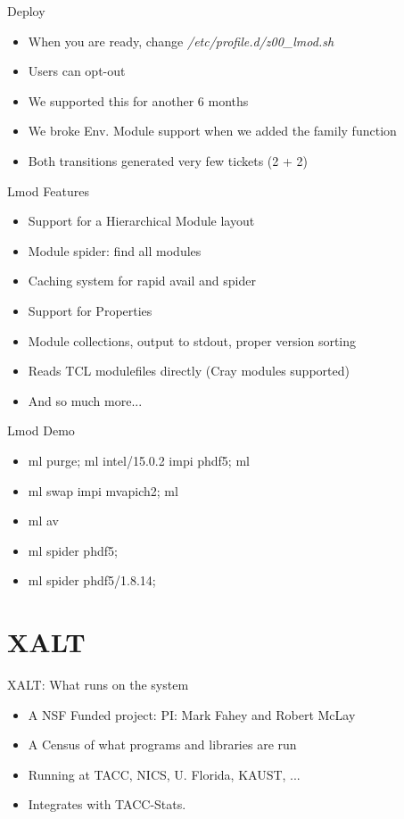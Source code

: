 \documentclass{beamer}
\begin{document}
\begin{frame}{Deploy}
  \begin{itemize}
    \item When you are ready, change \emph{/etc/profile.d/z00\_lmod.sh}
    \item Users can opt-out
    \item We supported this for another 6 months
    \item We broke Env. Module support when we added the family function
    \item Both transitions generated very few tickets (2 + 2)
  \end{itemize}
\end{frame}

\begin{frame}{Lmod Features}
  \begin{itemize}
    \item Support for a Hierarchical Module layout
    \item Module spider: find all modules
    \item Caching system for rapid avail and spider
    \item Support for Properties
    \item Module collections, output to stdout, proper version sorting
    \item Reads TCL modulefiles directly (Cray modules supported)
    \item And so much more...
  \end{itemize}
\end{frame}

\begin{frame}{Lmod Demo}
  \begin{itemize}
    \item ml purge; ml intel/15.0.2 impi phdf5; ml
    \item ml swap impi mvapich2; ml
    \item ml av
    \item ml spider phdf5;
    \item ml spider phdf5/1.8.14;
  \end{itemize}
\end{frame}

\section{XALT}

\begin{frame}{XALT: What runs on the system}
  \begin{itemize}
    \item A NSF Funded project: PI: Mark Fahey and Robert McLay
    \item A Census of what programs and libraries are run
    \item Running at TACC, NICS, U. Florida, KAUST, ...
    \item Integrates with TACC-Stats.
  \end{itemize}
\end{frame}
\end{document}
